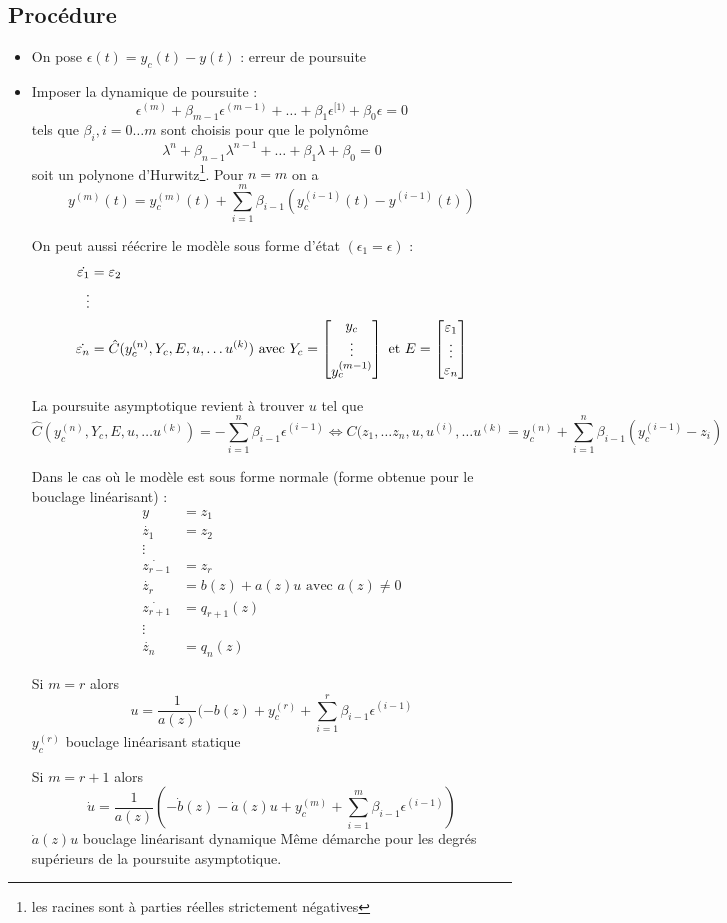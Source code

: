 \documentclass[main.tex]{subfiles}
\begin{document}
\subsection{Procédure}
\begin{itemize}
\item On pose $\epsilon(t) = y_c(t) - y(t)$ : erreur de poursuite
\item Imposer la dynamique de poursuite : \[\epsilon^{(m)} + \beta_{m-1} \epsilon^{(m-1)} + \dots + \beta_1 \epsilon^{[1)} + \beta_0 \epsilon = 0 \] tels que $\beta_i,i=0\dots m$ sont choisis pour que le polynôme
\[ \lambda^n + \beta_{n-1} \lambda^{n-1} + \dots + \beta_1 \lambda + \beta_0 = 0 \] soit un polynone d'Hurwitz\footnote{les racines sont à parties réelles strictement négatives}.
Pour $n=m$ on a 
\[ y^{(m)} (t) = y_c^{(m)}(t) + \sum
_{i=1}^m \beta_{i-1}(y_c^{(i-1)}(t) - y^{(i-1)}(t)) \]

On peut aussi réécrire le modèle sous forme d'état $(\epsilon_1 = \epsilon)$ :
\begin{align*}
\dot{\varepsilon_1} & = \varepsilon_2 \\
\vdots \\
\dot{\varepsilon_n} & = \hat{C}(y_c^{(n)}, Y_c, E , u , \dots
 u^{(k)}) \text{ avec } Y_c = \begin{bmatrix} y_c \\ \vdots \\ y_c^{(m-1)} \end{bmatrix} \text{ et } E = \begin{bmatrix} \varepsilon_1 \\ \vdots \\ \varepsilon_n \end{bmatrix}
\end{align*}

La poursuite asymptotique revient à trouver $u$ tel que 
\[\hat{C}(y_c^{(n)},Y_c,E,u,\dots u^{(k)}) = -\sum_{i=1}^n \beta_{i-1}\epsilon^{(i-1)} \Leftrightarrow C(z_1,\dots z_n,u,u^{(i)},\dots u^{(k)} = y_c^{(n)} + \sum_{i=1}^n \beta_{i-1} (y_c^{(i-1)} -z_i) \]

Dans le cas où le modèle est sous forme normale (forme obtenue pour le bouclage linéarisant) : 
\begin{align*}
 y  &= z_1\\
  \dot{z_1} & = z_2 \\
\vdots \\
\dot{z_{r-1}} & = z_r \\
\dot{z_r} & = b(z) + a(z)u \text{ avec } a(z) \neq 0 \\
\dot{z_{r+1}} & = q_{r+1} (z) \\
\vdots \\
\dot{z_n} & = q_n(z)
\end{align*}

Si $m=r$ alors \[ u = \frac{1}{a(z)} (-b(z)+y_c^{(r)} + \sum_{i=1}^r \beta_{i-1} \epsilon^{(i-1)} \]
$y_c^{(r)}$ bouclage linéarisant statique

Si $m=r+1$ alors
\[ \dot{u} = \frac{1}{a(z)} (-\dot{b}(z) - \dot{a}(z)u + y_c^{(m)} + \sum_{i=1}^m \beta_{i-1} \epsilon^{(i-1)}) \]
$\dot{a}(z)u$ bouclage linéarisant dynamique
Même démarche pour les degrés supérieurs de la poursuite asymptotique.
\end{itemize}
\end{document}
